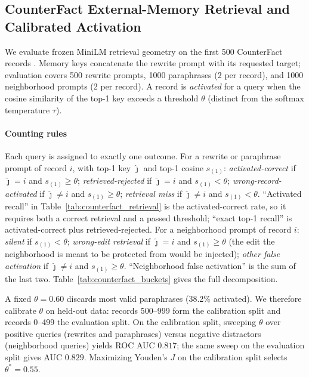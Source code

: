 \documentclass[preprint,12pt]{elsarticle}
\begin{document}
\subsection{CounterFact External-Memory Retrieval and Calibrated Activation}
\label{sec:counterfact}

We evaluate frozen MiniLM retrieval geometry on the first 500 CounterFact records \cite{meng2022locating}. Memory keys concatenate the rewrite prompt with its requested target; evaluation covers 500 rewrite prompts, 1000 paraphrases (2 per record), and 1000 neighborhood prompts (2 per record). A record is \emph{activated} for a query when the cosine similarity of the top-1 key exceeds a threshold $\theta$ (distinct from the softmax temperature $\tau$).

\paragraph{Counting rules}
Each query is assigned to exactly one outcome. For a rewrite or paraphrase prompt of record $i$, with top-1 key $\hat\jmath$ and top-1 cosine $s_{(1)}$: \emph{activated-correct} if $\hat\jmath=i$ and $s_{(1)}\ge\theta$; \emph{retrieved-rejected} if $\hat\jmath=i$ and $s_{(1)}<\theta$; \emph{wrong-record-activated} if $\hat\jmath\ne i$ and $s_{(1)}\ge\theta$; \emph{retrieval miss} if $\hat\jmath\ne i$ and $s_{(1)}<\theta$. ``Activated recall'' in Table~\ref{tab:counterfact_retrieval} is the activated-correct rate, so it requires both a correct retrieval and a passed threshold; ``exact top-1 recall'' is activated-correct plus retrieved-rejected. For a neighborhood prompt of record $i$: \emph{silent} if $s_{(1)}<\theta$; \emph{wrong-edit retrieval} if $\hat\jmath=i$ and $s_{(1)}\ge\theta$ (the edit the neighborhood is meant to be protected from would be injected); \emph{other false activation} if $\hat\jmath\ne i$ and $s_{(1)}\ge\theta$. ``Neighborhood false activation'' is the sum of the last two. Table~\ref{tab:counterfact_buckets} gives the full decomposition.

A fixed $\theta=0.60$ discards most valid paraphrases (38.2\% activated). We therefore calibrate $\theta$ on held-out data: records 500--999 form the calibration split and records 0--499 the evaluation split. On the calibration split, sweeping $\theta$ over positive queries (rewrites and paraphrases) versus negative distractors (neighborhood queries) yields ROC AUC $0.817$; the same sweep on the evaluation split gives AUC $0.829$. Maximizing Youden's $J$ on the calibration split selects $\theta^* = 0.55$.
\end{document}
